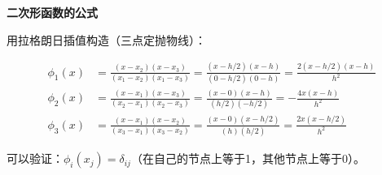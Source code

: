 \textbf{二次形函数的公式}

用拉格朗日插值构造（三点定抛物线）：

\begin{align}
\phi_1(x) &= \frac{(x - x_2)(x - x_3)}{(x_1 - x_2)(x_1 - x_3)} = \frac{(x - h/2)(x - h)}{(0 - h/2)(0 - h)} = \frac{2(x - h/2)(x - h)}{h^2} \\[5pt]
\phi_2(x) &= \frac{(x - x_1)(x - x_3)}{(x_2 - x_1)(x_2 - x_3)} = \frac{(x - 0)(x - h)}{(h/2)(- h/2)} = -\frac{4x(x - h)}{h^2} \\[5pt]
\phi_3(x) &= \frac{(x - x_1)(x - x_2)}{(x_3 - x_1)(x_3 - x_2)} = \frac{(x - 0)(x - h/2)}{(h)(h/2)} = \frac{2x(x - h/2)}{h^2}
\end{align}

可以验证：$\phi_i(x_j) = \delta_{ij}$（在自己的节点上等于1，其他节点上等于0）。

